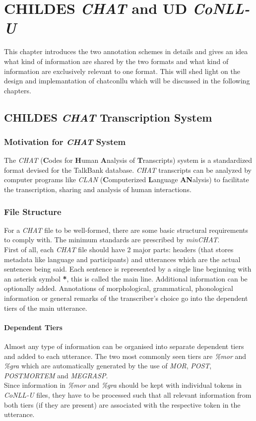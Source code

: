 \chapter{CHILDES \emph{CHAT} and UD \emph{CoNLL-U}} %

\label{Chapter2} %

This chapter introduces the two annotation schemes in details and gives an idea what kind of information are shared by the two formats and what kind of information are exclusively relevant to one format. This will shed light on the design and implemantation of chatconllu which will be discussed in the following chapters.

\section{CHILDES \emph{CHAT} Transcription System}
\subsection{Motivation for \emph{CHAT} System}
The \emph{CHAT} (\textbf{C}odes for \textbf{H}uman \textbf{A}nalysis of \textbf{T}ranscripts) system is a standardized format devised for the TalkBank database. \emph{CHAT} transcripts can be analyzed by computer programs like \emph{CLAN} (\textbf{C}omputerized \textbf{L}anguage \textbf{AN}alysis) to facilitate the transcription, sharing and analysis of human interactions.

\subsection{File Structure}
For a \emph{CHAT} file to be well-formed, there are some basic structural requirements to comply with. The minimum standards are prescribed by \emph{minCHAT}.\\
First of all, each \emph{CHAT} file should have 2 major parts: headers (that stores metadata like language and participants) and utterances which are the actual sentences being said. Each sentence is represented by a single line beginning with an asterisk symbol \textbf{*}, this is called the main line. Additional information can be optionally added. Annotations of morphological, grammatical, phonological information or general remarks of the transcriber's choice go into the dependent tiers of the main utterance.
\subsubsection{Dependent Tiers}
Almost any type of information can be organised into separate dependent tiers and added to each utterance. The two most commonly seen tiers are \emph{\%mor} and \emph{\%gra} which are automatically generated by the use of \emph{MOR}, \emph{POST}, \emph{POSTMORTEM} and \emph{MEGRASP}.\\
Since information in \emph{\%mor} and \emph{\%gra} should be kept with individual tokens in \emph{CoNLL-U} files, they have to be processed such that all relevant information from both tiers (if they are present) are associated with the respective token in the utterance.
